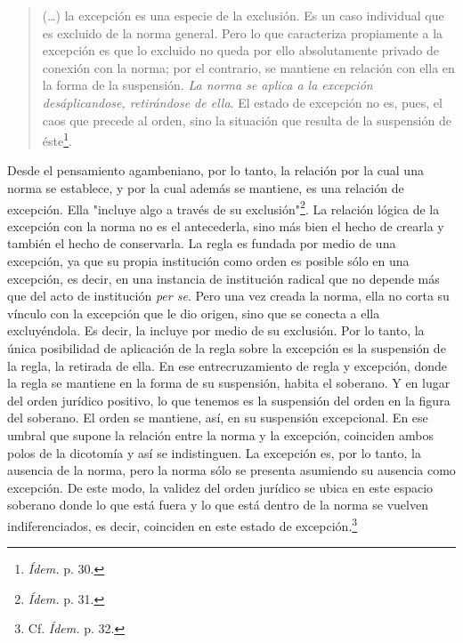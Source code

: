 \documentclass{book}
\begin{document}
\begin{quote}
(\dots) la excepción es una especie de la exclusión. Es un caso
individual que es excluido de la norma general. Pero lo que caracteriza
propiamente a la excepción es que lo excluido no queda por ello
absolutamente privado de conexión con la norma; por el contrario, se
mantiene en relación con ella en la forma de la suspensión. \emph{La
norma se aplica a la excepción desáplicandose, retirándose de ella}. El
estado de excepción no es, pues, el caos que precede al orden, sino la
situación que resulta de la suspensión de éste\footnote{\emph{Ídem.} p.
  30.}.
\end{quote}

Desde el pensamiento agambeniano, por lo tanto, la relación por la cual
una norma se establece, y por la cual además se mantiene, es una
relación de excepción. Ella "incluye algo a través de su
exclusión"\footnote{\emph{Ídem.} p. 31.}. La relación lógica de la
excepción con la norma no es el antecederla, sino más bien el hecho de
crearla y también el hecho de conservarla. La regla es fundada por medio
de una excepción, ya que su propia institución como orden es posible
sólo en una excepción, es decir, en una instancia de institución radical
que no depende más que del acto de institución \emph{per se}. Pero una
vez creada la norma, ella no corta su vínculo con la excepción que le
dio origen, sino que se conecta a ella excluyéndola. Es decir, la
incluye por medio de su exclusión. Por lo tanto, la única posibilidad de
aplicación de la regla sobre la excepción es la suspensión de la regla,
la retirada de ella. En ese entrecruzamiento de regla y excepción, donde
la regla se mantiene en la forma de su suspensión, habita el soberano. Y
en lugar del orden jurídico positivo, lo que tenemos es la suspensión
del orden en la figura del soberano. El orden se mantiene, así, en su
suspensión excepcional. En ese umbral que supone la relación entre la
norma y la excepción, coinciden ambos polos de la dicotomía y así se
indistinguen. La excepción es, por lo tanto, la ausencia de la norma,
pero la norma sólo se presenta asumiendo su ausencia como excepción. De
este modo, la validez del orden jurídico se ubica en este espacio
soberano donde lo que está fuera y lo que está dentro de la norma se
vuelven indiferenciados, es decir, coinciden en este estado de
excepción.\footnote{Cf. \emph{Ídem.} p. 32.}
\end{document}

